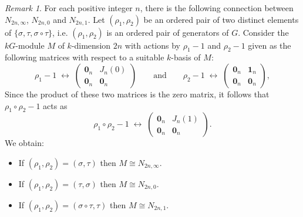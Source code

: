 \documentclass{amsart}
\numberwithin{equation}{section}
\numberwithin{table}{section}
\theoremstyle{plain}
\theoremstyle{definition}
\theoremstyle{remark}
\newtheorem{remark}[theorem]{Remark}
\begin{document}
\begin{remark}
\label{rem:01infty}
For each positive integer $n$, there is the following connection between $N_{2n,\infty}$, $N_{2n,0}$ and $N_{2n,1}$. Let $(\rho_1,\rho_2)$ be an ordered pair of two distinct elements of $\{\sigma,\tau,\sigma\circ\tau\}$, i.e. $(\rho_1,\rho_2)$ is an ordered pair of generators of $G$. Consider the $kG$-module $M$ of $k$-dimension $2n$ with actions by $\rho_1-1$ and $\rho_2-1$ given as the following matrices with respect to a suitable $k$-basis of $M$:
$$\rho_1-1 \;\longleftrightarrow\; \left(\begin{array}{c|c} \mathbf{0}_n&J_n(0)\\ \hline \mathbf{0}_n&\mathbf{0}_n\end{array}\right) 
\qquad\mbox{and}\qquad
\rho_2-1\;\longleftrightarrow\; \left(\begin{array}{c|c} \mathbf{0}_n&\mathbf{1}_n\\ \hline \mathbf{0}_n&\mathbf{0}_n\end{array}\right),$$
Since the product of these two matrices is the zero matrix, it follows that $\rho_1\circ\rho_2-1$ acts as 
$$\rho_1\circ\rho_2-1\;\longleftrightarrow\; \left(\begin{array}{c|c} \mathbf{0}_n&J_n(1)\\ \hline \mathbf{0}_n&\mathbf{0}_n\end{array}\right).$$
We obtain:
\begin{itemize}
\item[(a)] If $(\rho_1,\rho_2)=(\sigma,\tau)$ then $M\cong N_{2n,\infty}$.
\item[(b)] If $(\rho_1,\rho_2)=(\tau,\sigma)$ then $M\cong N_{2n,0}$.
\item[(c)] If $(\rho_1,\rho_2)=(\sigma\circ\tau,\tau)$ then $M\cong N_{2n,1}$.
\end{itemize}
\end{remark}
\end{document}

